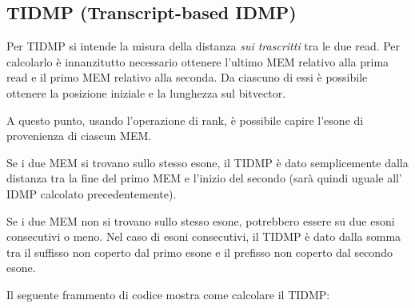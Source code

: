 

\subsection{TIDMP (Transcript-based IDMP)}
Per TIDMP si intende la misura della distanza \textit{sui trascritti} tra le due read. Per calcolarlo è innanzitutto necessario ottenere l'ultimo MEM relativo alla prima read e il primo MEM relativo alla seconda. Da ciascuno di essi è possibile ottenere la posizione iniziale e la lunghezza sul bitvector. 

A questo punto, usando l'operazione di rank, è possibile capire l'esone di provenienza di ciascun MEM.

Se i due MEM si trovano sullo stesso esone, il TIDMP è dato semplicemente dalla distanza tra la fine del primo MEM e l'inizio del secondo (sarà quindi uguale all' IDMP calcolato precedentemente).

Se i due MEM non si trovano sullo stesso esone, potrebbero essere su due esoni consecutivi o meno. Nel caso di esoni consecutivi, il TIDMP è dato dalla somma tra il suffisso non coperto dal primo esone e il prefisso non coperto dal secondo esone.

Il seguente frammento di codice mostra come calcolare il TIDMP:

